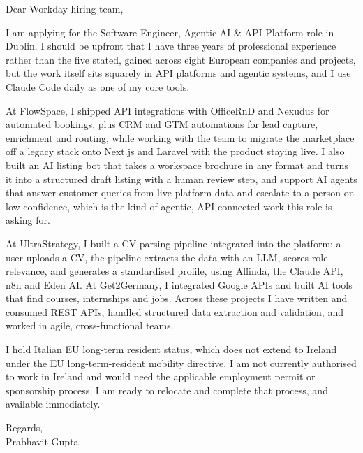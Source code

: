 \documentclass[a4paper,11pt]{article}
\begin{document}
Dear Workday hiring team,

I am applying for the Software Engineer, Agentic AI \& API Platform role in Dublin. I should be upfront that I have three years of professional experience rather than the five stated, gained across eight European companies and projects, but the work itself sits squarely in API platforms and agentic systems, and I use Claude Code daily as one of my core tools.

At FlowSpace, I shipped API integrations with OfficeRnD and Nexudus for automated bookings, plus CRM and GTM automations for lead capture, enrichment and routing, while working with the team to migrate the marketplace off a legacy stack onto Next.js and Laravel with the product staying live. I also built an AI listing bot that takes a workspace brochure in any format and turns it into a structured draft listing with a human review step, and support AI agents that answer customer queries from live platform data and escalate to a person on low confidence, which is the kind of agentic, API-connected work this role is asking for.

At UltraStrategy, I built a CV-parsing pipeline integrated into the platform: a user uploads a CV, the pipeline extracts the data with an LLM, scores role relevance, and generates a standardised profile, using Affinda, the Claude API, n8n and Eden AI. At Get2Germany, I integrated Google APIs and built AI tools that find courses, internships and jobs. Across these projects I have written and consumed REST APIs, handled structured data extraction and validation, and worked in agile, cross-functional teams.

I hold Italian EU long-term resident status, which does not extend to Ireland under the EU long-term-resident mobility directive. I am not currently authorised to work in Ireland and would need the applicable employment permit or sponsorship process. I am ready to relocate and complete that process, and available immediately.

Regards,\\
Prabhavit Gupta
\end{document}
